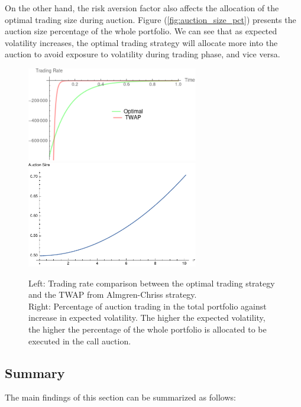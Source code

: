 On the other hand, the risk aversion factor also affects the allocation of the optimal trading size during auction. Figure (\ref{fig:auction_size_pct}) presents the auction size percentage of the whole portfolio. We can see that as expected volatility increases, the optimal trading strategy will allocate more into the auction to avoid exposure to volatility during trading phase, and vice versa.

\begin{figure}
  \centering
  \includegraphics[width=7.5cm]{images/ContinuousTradingRate}
  \includegraphics[width=7.5cm]{images/AuctionSizePct}
  \caption{Left: Trading rate comparison between the optimal trading strategy and the TWAP from Almgren-Chriss strategy.\\
  Right: Percentage of auction trading in the total portfolio against increase in expected volatility. The higher the expected volatility, the higher the percentage of the whole portfolio is allocated to be executed in the call auction.
  }
  \label{fig:trading_rate_comparison}
\end{figure}

\subsection{Summary}

The main findings of this section can be summarized as follows:

